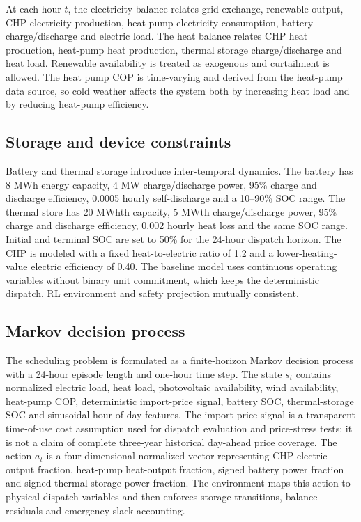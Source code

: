 \documentclass[preprint,12pt]{elsarticle}
\begin{document}


At each hour $t$, the electricity balance relates grid exchange, renewable output, CHP electricity production, heat-pump electricity consumption, battery charge/discharge and electric load. The heat balance relates CHP heat production, heat-pump heat production, thermal storage charge/discharge and heat load. Renewable availability is treated as exogenous and curtailment is allowed. The heat pump COP is time-varying and derived from the heat-pump data source, so cold weather affects the system both by increasing heat load and by reducing heat-pump efficiency.

\subsection{Storage and device constraints}

Battery and thermal storage introduce inter-temporal dynamics. The battery has 8 MWh energy capacity, 4 MW charge/discharge power, 95\% charge and discharge efficiency, 0.0005 hourly self-discharge and a 10--90\% SOC range. The thermal store has 20 MWhth capacity, 5 MWth charge/discharge power, 95\% charge and discharge efficiency, 0.002 hourly heat loss and the same SOC range. Initial and terminal SOC are set to 50\% for the 24-hour dispatch horizon. The CHP is modeled with a fixed heat-to-electric ratio of 1.2 and a lower-heating-value electric efficiency of 0.40. The baseline model uses continuous operating variables without binary unit commitment, which keeps the deterministic dispatch, RL environment and safety projection mutually consistent.

\subsection{Markov decision process}

The scheduling problem is formulated as a finite-horizon Markov decision process with a 24-hour episode length and one-hour time step. The state $s_t$ contains normalized electric load, heat load, photovoltaic availability, wind availability, heat-pump COP, deterministic import-price signal, battery SOC, thermal-storage SOC and sinusoidal hour-of-day features. The import-price signal is a transparent time-of-use cost assumption used for dispatch evaluation and price-stress tests; it is not a claim of complete three-year historical day-ahead price coverage. The action $a_t$ is a four-dimensional normalized vector representing CHP electric output fraction, heat-pump heat-output fraction, signed battery power fraction and signed thermal-storage power fraction. The environment maps this action to physical dispatch variables and then enforces storage transitions, balance residuals and emergency slack accounting.
\end{document}
